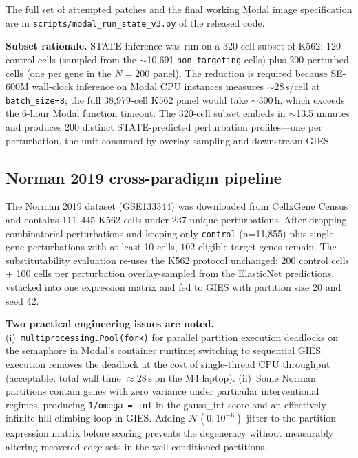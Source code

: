 \documentclass{article}
\begin{document}
The full set of attempted patches and the final working Modal image specification are in \texttt{scripts/modal\_run\_state\_v3.py} of the released code.

\textbf{Subset rationale.} STATE inference was run on a 320-cell subset of K562: $120$ control cells (sampled from the $\sim$10{,}691 \texttt{non-targeting} cells) plus $200$ perturbed cells (one per gene in the $N{=}200$ panel). The reduction is required because SE-600M wall-clock inference on Modal CPU instances measures $\sim$28\,s/cell at \texttt{batch\_size=8}; the full 38{,}979-cell K562 panel would take $\sim$300\,h, which exceeds the 6-hour Modal function timeout. The 320-cell subset embeds in $\sim$13.5 minutes and produces 200 distinct STATE-predicted perturbation profiles---one per perturbation, the unit consumed by overlay sampling and downstream GIES.

\subsection{Norman 2019 cross-paradigm pipeline}
\label{app:norman_pipeline}

The Norman 2019 dataset (GSE133344) was downloaded from CellxGene Census and contains $111{,}445$ K562 cells under $237$ unique perturbations. After dropping combinatorial perturbations and keeping only \texttt{control} (n=11{,}855) plus single-gene perturbations with at least 10 cells, $102$ eligible target genes remain. The substitutability evaluation re-uses the K562 protocol unchanged: 200 control cells + 100 cells per perturbation overlay-sampled from the ElasticNet predictions, vstacked into one expression matrix and fed to GIES with partition size 20 and seed 42.

\textbf{Two practical engineering issues are noted.} (i)~\texttt{multiprocessing.Pool(fork)} for parallel partition execution deadlocks on the semaphore in Modal's container runtime; switching to sequential GIES execution removes the deadlock at the cost of single-thread CPU throughput (acceptable: total wall time ${\approx}28$\,s on the M4 laptop). (ii)~Some Norman partitions contain genes with zero variance under particular interventional regimes, producing \texttt{1/omega = inf} in the gauss\_int score and an effectively infinite hill-climbing loop in GIES. Adding $\mathcal{N}(0, 10^{-6})$ jitter to the partition expression matrix before scoring prevents the degeneracy without measurably altering recovered edge sets in the well-conditioned partitions.
\end{document}
